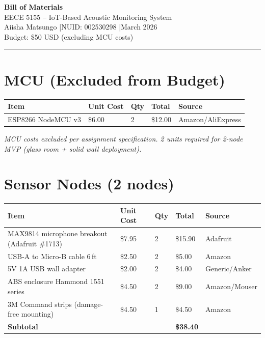 \documentclass[11pt, letterpaper]{article}
\begin{document}
\begin{center}
  {\LARGE\bfseries Bill of Materials}\\[6pt]
  {\large EECE 5155 -- IoT-Based Acoustic Monitoring System}\\[4pt]
  {\normalsize Aiisha Matsungo \quad|\quad NUID: 002530298 \quad|\quad March 2026}\\[2pt]
  {\normalsize Budget: \$50 USD (excluding MCU costs)}
\end{center}
\vspace{4pt}\hrule\vspace{10pt}

\section{MCU (Excluded from Budget)}

\begin{tabular}{L{6cm} R{2cm} C{1.5cm} R{2cm} L{3cm}}
\toprule
\textbf{Item} & \textbf{Unit Cost} & \textbf{Qty} & \textbf{Total} & \textbf{Source} \\
\midrule
ESP8266 NodeMCU v3 & \$6.00 & 2 & \$12.00 & Amazon/AliExpress \\
\bottomrule
\end{tabular}

\vspace{4pt}
\textit{MCU costs excluded per assignment specification. 2 units required for
2-node MVP (glass room + solid wall deployment).}

\section{Sensor Nodes (2 nodes)}

\begin{tabular}{L{6.5cm} R{2cm} C{1.5cm} R{2cm} L{3cm}}
\toprule
\textbf{Item} & \textbf{Unit Cost} & \textbf{Qty} & \textbf{Total} & \textbf{Source} \\
\midrule
MAX9814 microphone breakout (Adafruit \#1713) & \$7.95 & 2 & \$15.90 & Adafruit \\
USB-A to Micro-B cable 6\,ft                  & \$2.50 & 2 & \$5.00  & Amazon \\
5V 1A USB wall adapter                         & \$2.00 & 2 & \$4.00  & Generic/Anker \\
ABS enclosure Hammond 1551 series              & \$4.50 & 2 & \$9.00  & Amazon/Mouser \\
3M Command strips (damage-free mounting)       & \$4.50 & 1 & \$4.50  & Amazon \\
\midrule
\textbf{Subtotal}                              &        &   & \textbf{\$38.40} & \\
\bottomrule
\end{tabular}
\end{document}
